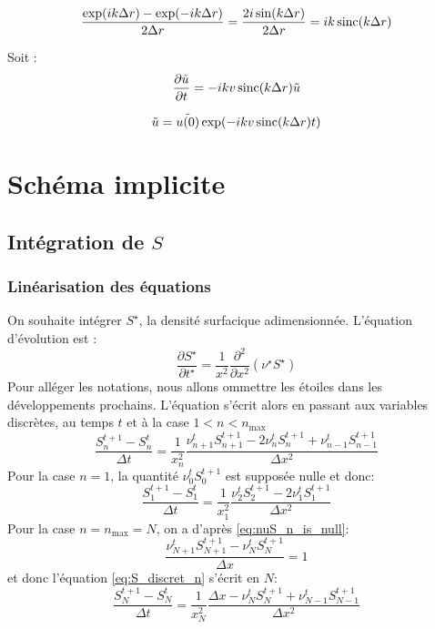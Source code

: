 \begin{equation}
    \frac{\exp(ik\Delta{r}) - \exp(-ik\Delta{r})}{2 \Delta{r}} = \frac{2 i \sin(k\Delta{r})}{2 \Delta{r}} = i k \operatorname{sinc}(k\Delta{r})
\end{equation}

Soit :
\begin{equation}
    \frac{\partial \tilde{u}}{\partial t} = - i k v \operatorname{sinc}(k\Delta{r}) \tilde{u}
\end{equation}

\begin{equation}
    \tilde{u} = \tilde{u(0)} \exp(-i k v \operatorname{sinc}(k \Delta{r}) t)
\end{equation}

\section{Schéma implicite}
\subsection{Intégration de $S$}
\label{subsec:S_integration}
\subsubsection{Linéarisation des équations}
On souhaite intégrer $S^\star$, la densité surfacique adimensionnée. L'équation d'évolution est :
\begin{equation}
  \frac{\partial S^\star}{\partial t^\star} = \frac{1}{x^2}\frac{\partial^2}{\partial x^2}\left(\nu^\star S^\star\right)
\end{equation}
Pour alléger les notations, nous allons ommettre les étoiles dans les développements prochains. L'équation s'écrit alors en passant aux variables discrètes, au temps $t$ et à la case $1<n<n_\textrm{max}$
\begin{equation}
  \label{eq:S_discret_n}
  \frac{S^{t+1}_n - S^t_n}{\Delta t} = \frac{1}{x_n^2}\frac{\nu^t_{n+1}S^{t+1}_{n+1} - 2 \nu^t_nS^{t+1}_n + \nu^t_{n-1}S^{t+1}_{n-1}}{\Delta x^2}
\end{equation}
Pour la case $n = 1$, la quantité $\nu^t_{0}S^{t+1}_{0}$ est supposée nulle et donc: 
\begin{equation}
  \label{eq:S_discret_1}
  \frac{S^{t+1}_1 - S^t_1}{\Delta t} = \frac{1}{x_1^2}\frac{\nu^t_{2}S^{t+1}_{2} - 2 \nu^t_1S^{t+1}_1}{\Delta x^2}
\end{equation}
Pour la case $n = n_\textrm{max} = N$, on a d'après \eqref{eq:nuS_n_is_null}:
\begin{equation}
  \frac{\nu^{t}_{N+1}S^{t+1}_{N+1} - \nu^{t}_NS^{t+1}_N}{\Delta x} = 1
\end{equation}
et donc l'équation \eqref{eq:S_discret_n} s'écrit en $N$:
\begin{equation}
  \label{eq:S_discret_N}
  \frac{S^{t+1}_N - S^t_N}{\Delta t} = \frac{1}{x_N^2}\frac{\Delta x - \nu^{t}_NS^{t+1}_N + \nu^{t}_{N-1}S^{t+1}_{N-1}}{\Delta x^2}
\end{equation}

